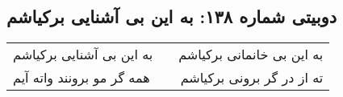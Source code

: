 \begin{center}
\section*{دوبیتی شماره ۱۳۸: به این بی آشنایی برکیاشم}
\label{sec:138}
\begin{longtable}{l p{0.5cm} r}
به این بی آشنایی برکیاشم
&&
به این بی خانمانی برکیاشم
\\
همه گر مو برونند واته آیم
&&
ته از در گر برونی برکیاشم
\\
\end{longtable}
\end{center}
